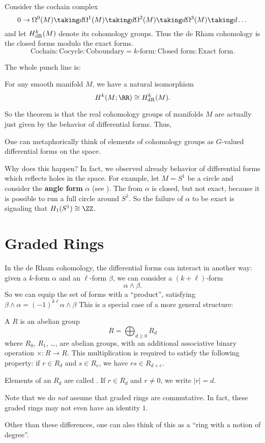 Consider the cochain complex
\[
	0 \to \Omega^0(M)
	\taking d \Omega^1(M)
	\taking d \Omega^2(M)
	\taking d \Omega^3(M)
	\taking d \dots
\]
and let $H_{\mathrm{dR}}^k(M)$ denote its cohomology groups.
Thus the de Rham cohomology is the closed forms modulo the exact forms.
\[
	\text{Cochain} : \text{Cocycle} : \text{Coboundary}
	= \text{$k$-form} : \text{Closed form} : \text{Exact form}. 
\]

The whole punch line is:
\begin{theorem}
	For any smooth manifold $M$, we have a natural isomorphism
	\[ H^k(M; \RR) \cong \HdR^k(M). \]
\end{theorem}
So the theorem is that the real cohomology groups of manifolds $M$
are actually just given by the behavior of differential forms.
Thus, 
\begin{moral}
	One can metaphorically think of elements of cohomology groups
	as $G$-valued differential forms on the space.
\end{moral}

Why does this happen?
In fact, we observed already behavior of differential
forms which reflects holes in the space.
For example, let $M = S^1$ be a circle
and consider the \textbf{angle form} $\alpha$
(see ).
The from $\alpha$ is closed, but not exact,
because it is possible to run a full circle around $S^1$.
So the failure of $\alpha$ to be exact is signaling
that $H_1(S^1) \cong \ZZ$.

\section{Graded Rings}
In the de Rham cohomology, the differential forms can interact in another way:
given a $k$-form $\alpha$ and an $\ell$-form $\beta$, we can consider
a $(k+\ell)$-form
\[ \alpha \wedge \beta. \]
So we can equip the set of forms with a ``product'', satisfying
$\beta \wedge \alpha = (-1)^{k\ell} \alpha \wedge \beta$
This is a special case of a more general structure:

\begin{definition}
	A  $R$ is an abelian group
	\[ R = \bigoplus_{d \ge 0} R_d \]
	where $R_0$, $R_1$, \dots, are abelian groups,
	with an additional associative binary operation $\times : R \to R$.
	This multiplication is required to satisfy the following property:
	if $r \in R_d$ and $s \in R_e$,
	we have $rs \in R_{d+e}$.

	Elements of an $R_d$ are called .
	If $r \in R_d$ and $r \neq 0$, we write $|r| = d$.
\end{definition}
\begin{remark}
	Note that we do \emph{not} assume that graded rings are commutative.
	In fact, these graded rings may not even have an identity $1$.

	Other than these differences, one can also think of this as a
	``ring with a notion of degree''.
\end{remark}

